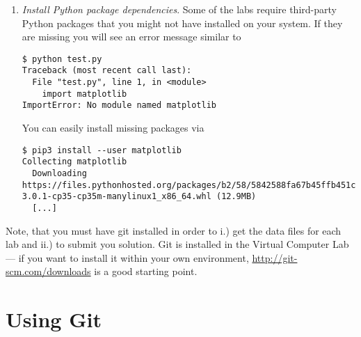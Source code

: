 \begin{enumerate}
\begin{lstlisting}
$ cd username-repo
$ ls -rtl
drwx------ 2 username username 4096 Oct 31 19:48 asg-tryout

# Record your credentials (has to be done once only).
$ git config --local user.name "Firstname Surname"
$ git config --local user.email "username@student.sdu.dk"
\end{lstlisting}


You can also use SSH for authentification. In this case, you have to follow the instructions linked from the \href{https://docs.gitlab.com/ee/topics/git/clone.html}{GitLab official documentation}. 

\item \emph{Install Python package dependencies}.
\label{step:install-dependencies}
Some of the labs require third-party Python packages that you might not have installed on your system. If they are missing you will see an error message similar to 
\begin{lstlisting}
$ python test.py 
Traceback (most recent call last):
  File "test.py", line 1, in <module>
    import matplotlib
ImportError: No module named matplotlib
\end{lstlisting}

You can easily install missing packages via

\begin{lstlisting}
$ pip3 install --user matplotlib
Collecting matplotlib
  Downloading https://files.pythonhosted.org/packages/b2/58/5842588fa67b45ffb451c4c98eda283c0c42b8f2c5e503e4f6d9ff3c3a63/matplotlib-3.0.1-cp35-cp35m-manylinux1_x86_64.whl (12.9MB)
  [...]
  \end{lstlisting}

\end{enumerate}


Note, that you must have git installed in order to i.) get the data files for each lab and ii.) to submit you solution. Git is installed in the Virtual Computer Lab --- if you want to install it within your own environment, \url{http://git-scm.com/downloads} is a good starting point.

\section*{Using Git} %


